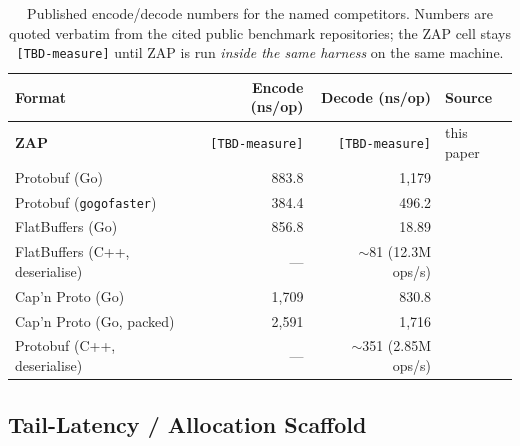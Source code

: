 \begin{table}[h]
\centering
\small
\begin{tabular}{@{}lrrl@{}}
\toprule
\textbf{Format} & \textbf{Encode (ns/op)} & \textbf{Decode (ns/op)} & \textbf{Source} \\
\midrule
\textbf{ZAP}                       & \texttt{[TBD-measure]} & \texttt{[TBD-measure]} & this paper \\
\midrule
Protobuf (Go)                      & 883.8 & 1{,}179 & \cite{kcchubuffer} \\
Protobuf (\texttt{gogofaster})     & 384.4 & 496.2   & \cite{kcchubuffer} \\
FlatBuffers (Go)                   & 856.8 & 18.89   & \cite{kcchubuffer} \\
FlatBuffers (C++, deserialise)     & ---   & $\sim$81 (12.3M ops/s) & \cite{chronoxorbench} \\
Cap'n Proto (Go)                   & 1{,}709 & 830.8 & \cite{kcchubuffer} \\
Cap'n Proto (Go, packed)           & 2{,}591 & 1{,}716 & \cite{kcchubuffer} \\
Protobuf (C++, deserialise)        & ---   & $\sim$351 (2.85M ops/s) & \cite{chronoxorbench} \\
\bottomrule
\end{tabular}
\caption{Published encode/decode numbers for the named competitors.
Numbers are quoted verbatim from the cited public benchmark
repositories; the ZAP cell stays \texttt{[TBD-measure]} until ZAP is
run \emph{inside the same harness} on the same machine.}
\label{tab:zap-lit-encode-decode}
\end{table}

\subsection{Tail-Latency / Allocation Scaffold}


